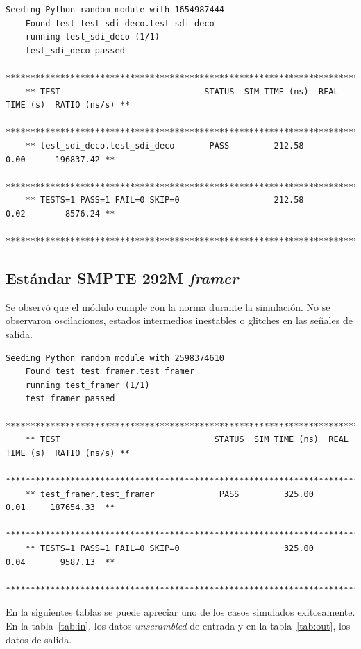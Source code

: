   {\tiny\begin{lstlisting}[caption= "Resultados \textit{test} de \textit{decoder}.]
    Seeding Python random module with 1654987444
    Found test test_sdi_deco.test_sdi_deco
    running test_sdi_deco (1/1)
    test_sdi_deco passed
    *****************************************************************************************
    ** TEST                             STATUS  SIM TIME (ns)  REAL TIME (s)  RATIO (ns/s) **
    *****************************************************************************************
    ** test_sdi_deco.test_sdi_deco       PASS         212.58           0.00      196837.42 **
    *****************************************************************************************
    ** TESTS=1 PASS=1 FAIL=0 SKIP=0                   212.58           0.02        8576.24 **
    *****************************************************************************************
  \end{lstlisting}}

\subsection{Estándar SMPTE 292M \textit{framer}}

  Se observó que el módulo cumple con la norma durante la simulación.
  No se observaron oscilaciones, estados intermedios inestables o glitches en las
  señales de salida.

  {\tiny\begin{lstlisting}[caption= "Resultados \textit{test} de \textit{framer}.]
    Seeding Python random module with 2598374610
    Found test test_framer.test_framer
    running test_framer (1/1)
    test_framer passed
    *******************************************************************************************
    ** TEST                               STATUS  SIM TIME (ns)  REAL TIME (s)  RATIO (ns/s) **
    *******************************************************************************************
    ** test_framer.test_framer             PASS         325.00           0.01     187654.33  **
    *******************************************************************************************
    ** TESTS=1 PASS=1 FAIL=0 SKIP=0                     325.00           0.04       9587.13  **
    *******************************************************************************************
  \end{lstlisting}}

  En la siguientes tablas se puede apreciar uno de los casos simulados exitosamente.
  En la tabla~\ref{tab:in}, los datos \textit{unscrambled} de entrada y en la tabla~\ref{tab:out}, los
  datos de salida.

